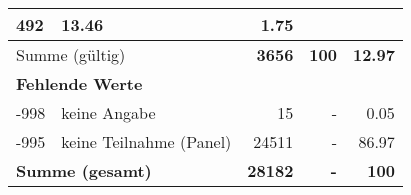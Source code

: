\begin{longtable}{lXrrr}
       \num{492} &
       \num[round-mode=places,round-precision=2]{13,46} &
         \num[round-mode=places,round-precision=2]{1,75} \\
     \midrule
     \multicolumn{2}{l}{Summe (gültig)} &
       \textbf{\num{3656}} &
     \textbf{100} &
       \textbf{\num[round-mode=places,round-precision=2]{12,97}} \\
     \multicolumn{5}{l}{\textbf{Fehlende Werte}}\\
       -998 &
       keine Angabe &
         \num{15} &
        - &
         \num[round-mode=places,round-precision=2]{0,05} \\
       -995 &
       keine Teilnahme (Panel) &
         \num{24511} &
        - &
         \num[round-mode=places,round-precision=2]{86,97} \\
     \midrule
     \multicolumn{2}{l}{\textbf{Summe (gesamt)}} &
          \textbf{\num{28182}} &
        \textbf{-} &
        \textbf{100} \\
     \bottomrule
     \end{longtable}
     
